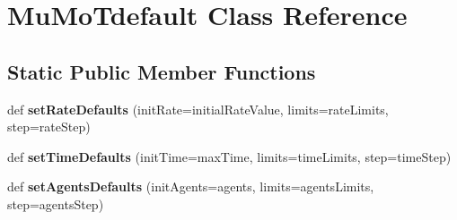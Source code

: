 \hypertarget{class_mu_mo_t_1_1_mu_mo_tdefault}{}\section{Mu\+Mo\+Tdefault Class Reference}
\label{class_mu_mo_t_1_1_mu_mo_tdefault}
\subsection*{Static Public Member Functions}
\begin{DoxyCompactItemize}
\item 
\mbox{\label{class_mu_mo_t_1_1_mu_mo_tdefault_a05986328f4ad60ef772b6657f247c89b}} 
def {\bfseries set\+Rate\+Defaults} (init\+Rate=initial\+Rate\+Value, limits=rate\+Limits, step=rate\+Step)
\item 
\mbox{\label{class_mu_mo_t_1_1_mu_mo_tdefault_a25925557048c87991fcd69291ada1aab}} 
def {\bfseries set\+Time\+Defaults} (init\+Time=max\+Time, limits=time\+Limits, step=time\+Step)
\item 
\mbox{\label{class_mu_mo_t_1_1_mu_mo_tdefault_a6e53ae86fa8ac5d5aade392121612eab}} 
def {\bfseries set\+Agents\+Defaults} (init\+Agents=agents, limits=agents\+Limits, step=agents\+Step)
\end{DoxyCompactItemize}
